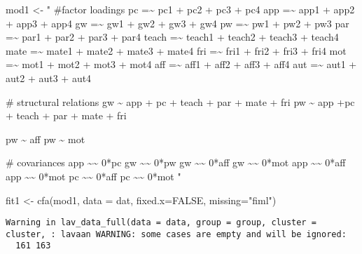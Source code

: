\documentclass[
  letterpaper,
  DIV=11,
  numbers=noendperiod]{scrartcl}
\newenvironment{Shaded}{\begin{snugshade}}{\end{snugshade}}
\newcommand{\AttributeTok}[1]{\textcolor[rgb]{0.40,0.45,0.13}{#1}}
\newcommand{\ConstantTok}[1]{\textcolor[rgb]{0.56,0.35,0.01}{#1}}
\newcommand{\FunctionTok}[1]{\textcolor[rgb]{0.28,0.35,0.67}{#1}}
\newcommand{\NormalTok}[1]{\textcolor[rgb]{0.00,0.23,0.31}{#1}}
\newcommand{\OtherTok}[1]{\textcolor[rgb]{0.00,0.23,0.31}{#1}}
\newcommand{\StringTok}[1]{\textcolor[rgb]{0.13,0.47,0.30}{#1}}
\begin{document}
\begin{Shaded}
\begin{Highlighting}[]
\NormalTok{mod1 }\OtherTok{\textless{}{-}} \StringTok{"}
\StringTok{\#factor loadings}
\StringTok{pc =\textasciitilde{} pc1 + pc2 + pc3 + pc4}
\StringTok{app =\textasciitilde{} app1 + app2 + app3 + app4}
\StringTok{gw =\textasciitilde{} gw1 + gw2 + gw3 + gw4}
\StringTok{pw =\textasciitilde{} pw1 + pw2 + pw3}
\StringTok{par =\textasciitilde{} par1 + par2 + par3 + par4}
\StringTok{teach =\textasciitilde{} teach1 + teach2 + teach3 + teach4}
\StringTok{mate =\textasciitilde{} mate1 + mate2 + mate3 + mate4}
\StringTok{fri =\textasciitilde{} fri1 + fri2 + fri3 + fri4}
\StringTok{mot =\textasciitilde{} mot1 + mot2 + mot3 + mot4}
\StringTok{aff =\textasciitilde{} aff1 + aff2 + aff3 + aff4}
\StringTok{aut =\textasciitilde{} aut1 + aut2 + aut3 + aut4}

\StringTok{\# structural relations}
\StringTok{gw \textasciitilde{} app + pc + teach + par + mate + fri}
\StringTok{pw \textasciitilde{} app +pc + teach + par + mate + fri}

\StringTok{pw \textasciitilde{} aff}
\StringTok{pw \textasciitilde{} mot}

\StringTok{\# covariances}
\StringTok{app \textasciitilde{}\textasciitilde{} 0*pc}
\StringTok{gw \textasciitilde{}\textasciitilde{} 0*pw}
\StringTok{gw \textasciitilde{}\textasciitilde{} 0*aff}
\StringTok{gw \textasciitilde{}\textasciitilde{} 0*mot}
\StringTok{app \textasciitilde{}\textasciitilde{} 0*aff}
\StringTok{app \textasciitilde{}\textasciitilde{} 0*mot}
\StringTok{pc \textasciitilde{}\textasciitilde{} 0*aff}
\StringTok{pc \textasciitilde{}\textasciitilde{} 0*mot}
\StringTok{"}
\end{Highlighting}
\end{Shaded}

\begin{Shaded}
\begin{Highlighting}[]
\NormalTok{fit1 }\OtherTok{\textless{}{-}} \FunctionTok{cfa}\NormalTok{(mod1, }\AttributeTok{data =}\NormalTok{ dat, }\AttributeTok{fixed.x=}\ConstantTok{FALSE}\NormalTok{, }\AttributeTok{missing=}\StringTok{"fiml"}\NormalTok{)}
\end{Highlighting}
\end{Shaded}

\begin{verbatim}
Warning in lav_data_full(data = data, group = group, cluster = cluster, : lavaan WARNING: some cases are empty and will be ignored:
  161 163
\end{verbatim}
\end{document}
